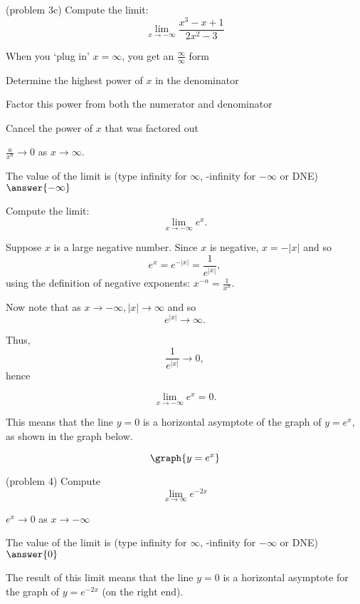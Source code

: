 \documentclass[handout]{ximera}
\begin{document}
\begin{problem}(problem 3c)
  Compute the limit:
  \[
  \lim_{x \to -\infty} \frac{x^3 - x + 1}{2x^2- 3}
  \]
  
    \begin{hint}
      When you `plug in' $x = \infty$, you get an $\frac{\infty}{\infty}$ form
    \end{hint}
    \begin{hint}
      Determine the highest power of $x$ in the denominator
    \end{hint}
    \begin{hint}
      Factor this power from both the numerator and denominator
    \end{hint}
    \begin{hint}
      Cancel the power of $x$ that was factored out
    \end{hint}
    \begin{hint}
      $\frac{a}{x^n} \to 0$ as $x \to \infty$.
    \end{hint}
		The value of the limit is
		(type infinity for $\infty$, -infinity for $-\infty$ or DNE)
		 $\answer{-\infty}$
		
		
\end{problem}


\begin{example}[example 4]

Compute the limit: 
\[
\lim_{x\to -\infty} e^x.
\]

Suppose $x$ is a large negative number.  Since $x$ is negative, $x = -|x|$ and so
\[
e^x = e^{-|x|} = \frac{1}{e^{|x|}},
\]
using the definition of negative exponents: $x^{-n} = \frac{1}{x^n}$.

Now note that as $x\to -\infty, |x| \to \infty$ and so 
\[
e^{|x|} \to \infty.
\]

Thus, 
\[
\frac{1}{e^{|x|}} \to 0,
\]
hence

\[
\lim_{x\to -\infty} e^x = 0.
\]

This means that the line $y=0$ is a horizontal asymptote of the graph of $y = e^x$,
as shown in the graph below.

\[
\graph{y=e^x}
\]

\end{example}

\begin{problem}(problem 4)
Compute 
\[ \lim_{x \to \infty} e^{-2x}\]

\begin{hint}
$e^x \to 0$ as $x \to -\infty$
\end{hint}

The value of the limit is
		(type infinity for $\infty$, -infinity for $-\infty$ or DNE)
		 $\answer{0}$
		
		The result of this limit means that the line $y = 0$  is a horizontal asymptote
for the graph of $y = e^{-2x}$ (on the right end).
\end{problem}
\end{document}
